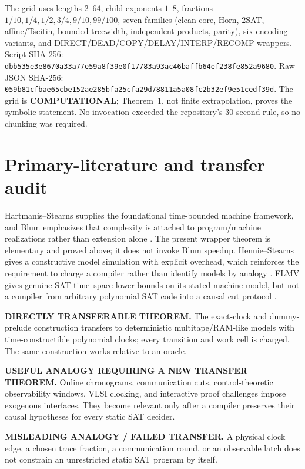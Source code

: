 \documentclass[11pt]{article}
\newcommand{\COMP}{\textbf{COMPUTATIONAL}}
\begin{document}
The grid uses lengths $2$--$64$, child exponents $1$--$8$, fractions
$1/10,1/4,1/2,3/4,9/10,99/100$, seven families (clean core, Horn, 2SAT,
affine/Tseitin, bounded treewidth, independent products, parity), six encoding
variants, and DIRECT/DEAD/COPY/DELAY/INTERP/RECOMP wrappers.  Script SHA-256:
\nolinkurl{dbb535e3e8670a33a77e59a8f39e0f17783a93ac46baffb64ef238fe852a9680}.
Raw JSON SHA-256:
\nolinkurl{059b81cfbae65cbe152ae285bfa25cfa29d78811a5a08fc2b32ef9e51cedf39d}.
The grid is \COMP; Theorem~1, not finite extrapolation, proves the symbolic
statement.  No invocation exceeded the repository's 30-second rule, so no
chunking was required.

\section{Primary-literature and transfer audit}

Hartmanis--Stearns supplies the foundational time-bounded machine framework,
and Blum emphasizes that complexity is attached to program/machine
realizations rather than extension alone \cite{hs,blum}.  The present wrapper
theorem is elementary and proved above; it does not invoke Blum speedup.
Hennie--Stearns gives a constructive model simulation with explicit overhead,
which reinforces the requirement to charge a compiler rather than identify
models by analogy \cite{hennie}.  FLMV gives genuine SAT time--space lower
bounds on its stated machine model, but not a compiler from arbitrary
polynomial SAT code into a causal cut protocol \cite{flmv}.

\begin{description}[leftmargin=0cm,labelwidth=0cm]
\item[] \textbf{DIRECTLY TRANSFERABLE THEOREM.}
The exact-clock and dummy-prelude construction transfers to deterministic
multitape/RAM-like models with time-constructible polynomial clocks; every
transition and work cell is charged.  The same construction works relative to
an oracle.
\item[] \textbf{USEFUL ANALOGY REQUIRING A NEW TRANSFER THEOREM.}
Online chronograms, communication cuts, control-theoretic observability
windows, VLSI clocking, and interactive proof challenges impose exogenous
interfaces.  They become relevant only after a compiler preserves their
causal hypotheses for every static SAT decider.
\item[] \textbf{MISLEADING ANALOGY / FAILED TRANSFER.}
A physical clock edge, a chosen trace fraction, a communication round, or an
observable latch does not constrain an unrestricted static SAT program by
itself.
\end{description}
\end{document}
